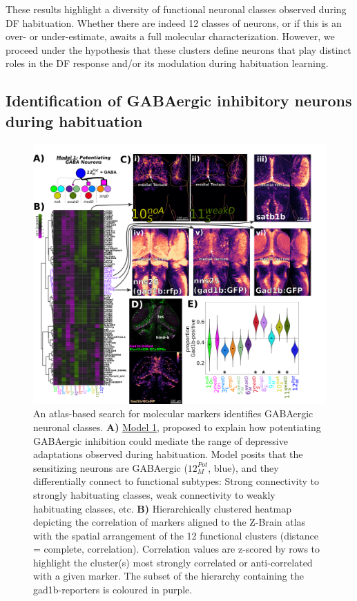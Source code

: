 \documentclass[9pt,lineno]{RandlettLab_elife}
\begin{document}
These results highlight a diversity of functional neuronal classes observed during DF habituation. Whether there are indeed 12 classes of neurons, or if this is an over- or under-estimate, awaits a full molecular characterization. However, we proceed under the hypothesis that these clusters define neurons that play distinct roles in the DF response and/or its modulation during habituation learning. 
\pagebreak
\subsection{Identification of GABAergic inhibitory neurons during habituation}

\begin{figure}
\begin{fullwidth}
\begin{center}
\includegraphics[width=0.99\linewidth]{Figure7-GABA.png}
\caption{
An atlas-based search for molecular markers identifies GABAergic neuronal classes. 
\textbf{A)} \underline{Model 1}, proposed to explain how potentiating GABAergic inhibition could mediate the range of depressive adaptations observed during habituation. Model posits that the sensitizing neurons are GABAergic ($12_{M}^{Pot}$, blue), and they differentially connect to functional subtypes: Strong connectivity to strongly habituating classes, weak connectivity to weakly habituating classes, etc. 
\textbf{B)} Hierarchically clustered heatmap depicting the correlation of markers aligned to the Z-Brain atlas with the spatial arrangement of the 12 functional clusters  (distance = complete, correlation). Correlation values are z-scored by rows to highlight the cluster(s) most strongly correlated or anti-correlated with a given marker. The subset of the hierarchy containing the gad1b-reporters is coloured in purple. 
}
\end{center}
\end{fullwidth}
\end{figure}
\end{document}
